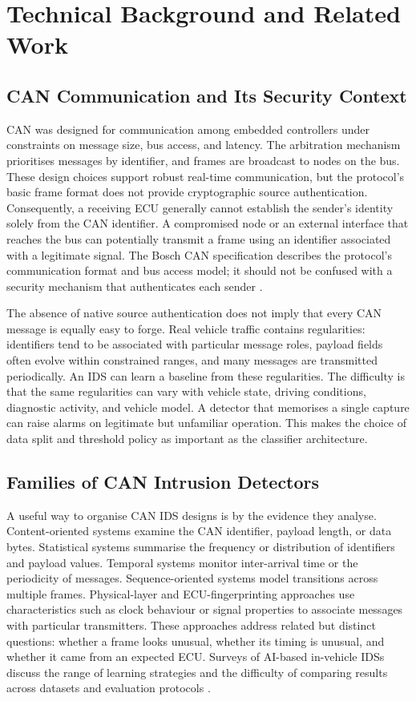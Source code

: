 \documentclass[journal]{IEEEtran}
\begin{document}
\section{Technical Background and Related Work}
\subsection{CAN Communication and Its Security Context}
CAN was designed for communication among embedded controllers under constraints on message size, bus access, and latency. The arbitration mechanism prioritises messages by identifier, and frames are broadcast to nodes on the bus. These design choices support robust real-time communication, but the protocol's basic frame format does not provide cryptographic source authentication. Consequently, a receiving ECU generally cannot establish the sender's identity solely from the CAN identifier. A compromised node or an external interface that reaches the bus can potentially transmit a frame using an identifier associated with a legitimate signal. The Bosch CAN specification describes the protocol's communication format and bus access model; it should not be confused with a security mechanism that authenticates each sender \cite{bosch1991can}.

The absence of native source authentication does not imply that every CAN message is equally easy to forge. Real vehicle traffic contains regularities: identifiers tend to be associated with particular message roles, payload fields often evolve within constrained ranges, and many messages are transmitted periodically. An IDS can learn a baseline from these regularities. The difficulty is that the same regularities can vary with vehicle state, driving conditions, diagnostic activity, and vehicle model. A detector that memorises a single capture can raise alarms on legitimate but unfamiliar operation. This makes the choice of data split and threshold policy as important as the classifier architecture.

\subsection{Families of CAN Intrusion Detectors}
A useful way to organise CAN IDS designs is by the evidence they analyse. Content-oriented systems examine the CAN identifier, payload length, or data bytes. Statistical systems summarise the frequency or distribution of identifiers and payload values. Temporal systems monitor inter-arrival time or the periodicity of messages. Sequence-oriented systems model transitions across multiple frames. Physical-layer and ECU-fingerprinting approaches use characteristics such as clock behaviour or signal properties to associate messages with particular transmitters. These approaches address related but distinct questions: whether a frame looks unusual, whether its timing is unusual, and whether it came from an expected ECU. Surveys of AI-based in-vehicle IDSs discuss the range of learning strategies and the difficulty of comparing results across datasets and evaluation protocols \cite{rajapaksha2023survey,althunayyan2026survey}.
\end{document}
